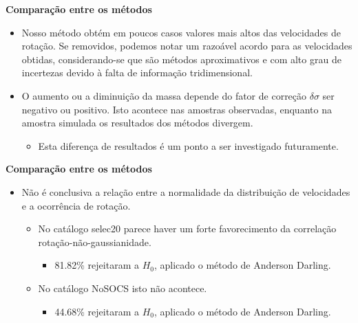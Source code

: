 \documentclass[xcolor=dvipsnames,10pt]{beamer}
\begin{document}
\begin{frame}{\textbf{Comparação entre os métodos}}
  \begin{itemize}
    \item Nosso método obtém em poucos casos valores mais altos das velocidades de rotação. Se removidos, podemos notar um razoável acordo para as velocidades obtidas, considerando-se que são métodos aproximativos e com alto grau de incertezas devido à falta de informação tridimensional.     
    \item O aumento ou a diminuição da massa depende do fator de correção $\delta \sigma$ ser negativo ou positivo. Isto acontece nas amostras observadas, enquanto na amostra simulada os resultados dos métodos divergem.
      \begin{itemize}
        \item Esta diferença de resultados é um ponto a ser investigado futuramente.
      \end{itemize}
  \end{itemize}
\end{frame}

\begin{frame}{\textbf{Comparação entre os métodos}}
  \begin{itemize}
    \item Não é conclusiva a relação entre a normalidade da distribuição de velocidades e a ocorrência de rotação.   
    \begin{itemize}
      \item No catálogo selec20 parece haver um forte favorecimento da correlação rotação-não-gaussianidade.
        \begin{itemize}
          \item 81.82\% rejeitaram a $H_0$, aplicado o método de Anderson Darling.
        \end{itemize}
      \item No catálogo NoSOCS isto não acontece.
        \begin{itemize}
            \item 44.68\% rejeitaram a $H_0$, aplicado o método de Anderson Darling.
          \end{itemize}
    \end{itemize}
  \end{itemize}
\end{frame}
\end{document}
